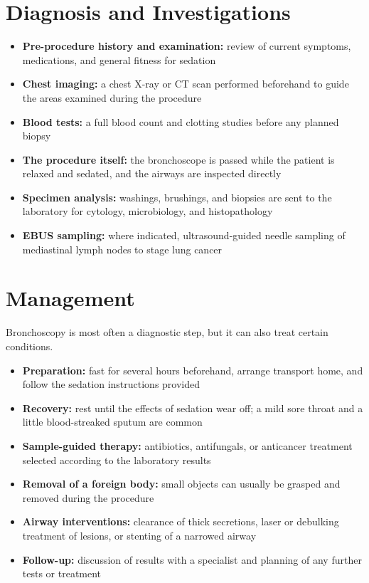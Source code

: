 \section*{Diagnosis and Investigations}
\begin{itemize}
    \item \textbf{Pre-procedure history and examination:} review of current symptoms, medications, and general fitness for sedation
    \item \textbf{Chest imaging:} a chest X-ray or CT scan performed beforehand to guide the areas examined during the procedure
    \item \textbf{Blood tests:} a full blood count and clotting studies before any planned biopsy
    \item \textbf{The procedure itself:} the bronchoscope is passed while the patient is relaxed and sedated, and the airways are inspected directly
    \item \textbf{Specimen analysis:} washings, brushings, and biopsies are sent to the laboratory for cytology, microbiology, and histopathology
    \item \textbf{EBUS sampling:} where indicated, ultrasound-guided needle sampling of mediastinal lymph nodes to stage lung cancer
\end{itemize}

\section*{Management}
Bronchoscopy is most often a diagnostic step, but it can also treat certain conditions.

\begin{itemize}
    \item \textbf{Preparation:} fast for several hours beforehand, arrange transport home, and follow the sedation instructions provided
    \item \textbf{Recovery:} rest until the effects of sedation wear off; a mild sore throat and a little blood-streaked sputum are common
    \item \textbf{Sample-guided therapy:} antibiotics, antifungals, or anticancer treatment selected according to the laboratory results
    \item \textbf{Removal of a foreign body:} small objects can usually be grasped and removed during the procedure
    \item \textbf{Airway interventions:} clearance of thick secretions, laser or debulking treatment of lesions, or stenting of a narrowed airway
    \item \textbf{Follow-up:} discussion of results with a specialist and planning of any further tests or treatment
\end{itemize}

